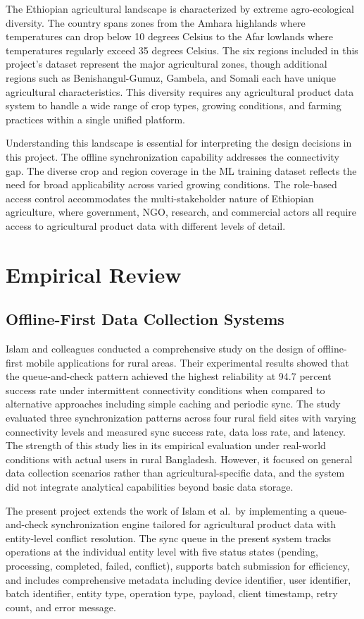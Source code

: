 \documentclass[12pt,a4paper,oneside]{report}
\begin{document}
The Ethiopian agricultural landscape is characterized by extreme agro-ecological diversity. The country spans zones from the Amhara highlands where temperatures can drop below 10 degrees Celsius to the Afar lowlands where temperatures regularly exceed 35 degrees Celsius. The six regions included in this project's dataset represent the major agricultural zones, though additional regions such as Benishangul-Gumuz, Gambela, and Somali each have unique agricultural characteristics. This diversity requires any agricultural product data system to handle a wide range of crop types, growing conditions, and farming practices within a single unified platform.

Understanding this landscape is essential for interpreting the design decisions in this project. The offline synchronization capability addresses the connectivity gap. The diverse crop and region coverage in the ML training dataset reflects the need for broad applicability across varied growing conditions. The role-based access control accommodates the multi-stakeholder nature of Ethiopian agriculture, where government, NGO, research, and commercial actors all require access to agricultural product data with different levels of detail.

\section{Empirical Review}
\subsection{Offline-First Data Collection Systems}
Islam and colleagues \cite{islam2021} conducted a comprehensive study on the design of offline-first mobile applications for rural areas. Their experimental results showed that the queue-and-check pattern achieved the highest reliability at 94.7 percent success rate under intermittent connectivity conditions when compared to alternative approaches including simple caching and periodic sync. The study evaluated three synchronization patterns across four rural field sites with varying connectivity levels and measured sync success rate, data loss rate, and latency. The strength of this study lies in its empirical evaluation under real-world conditions with actual users in rural Bangladesh. However, it focused on general data collection scenarios rather than agricultural-specific data, and the system did not integrate analytical capabilities beyond basic data storage.

The present project extends the work of Islam et al.\ by implementing a queue-and-check synchronization engine tailored for agricultural product data with entity-level conflict resolution. The sync queue in the present system tracks operations at the individual entity level with five status states (pending, processing, completed, failed, conflict), supports batch submission for efficiency, and includes comprehensive metadata including device identifier, user identifier, batch identifier, entity type, operation type, payload, client timestamp, retry count, and error message.
\end{document}
